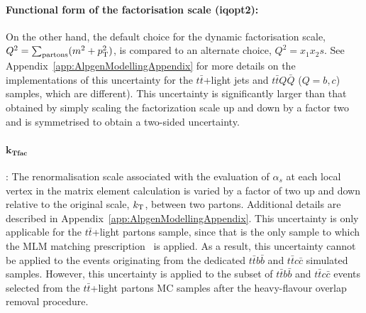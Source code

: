\paragraph{Functional form of the factorisation scale (iqopt2):} 
\fi
On the other hand, the default choice for the dynamic factorisation scale,
$Q^2=\sum_{\rm partons} (m^2 + \pt^2)$,  is compared to an alternate choice, $Q^2=x_1 x_2 s$.
\ifIsINT
See Appendix~\ref{app:AlpgenModellingAppendix} for more details on the implementations of this uncertainty 
for the $t\bar{t}$+light jets and $t\bar{t}Q\bar{Q}$ ($Q=b,c$) samples, which are different).
\fi
This uncertainty is significantly larger than that obtained by simply scaling the factorization scale up and down by a factor two 
and is symmetrised to obtain a two-sided uncertainty.

\ifIsINT
\paragraph{$\mathbf{k_{Tfac}}$}: 
\fi
The renormalisation scale associated with the evaluation of $\alpha_s$ at each local
vertex in the matrix element calculation is varied by a factor of two
up and down relative to the original scale, $k_{\rm T}$, between two
partons.  
\ifIsINT 
Additional details are described in Appendix~\ref{app:AlpgenModellingAppendix}.
\fi 
This uncertainty is only applicable for the $t\bar{t}$+light partons
sample, since that is the only sample to which the MLM matching prescription~\cite{mlm} is
applied. As a result, this uncertainty cannot be applied to the events 
originating from the dedicated $t\bar{t}b\bar{b}$ and $t\bar{t}c\bar{c}$
simulated samples. However, this uncertainty is applied to the subset of $t\bar{t}b\bar{b}$ and $t\bar{t}c\bar{c}$
events selected from the $t\bar{t}$+light partons MC samples after the
heavy-flavour overlap removal procedure.



